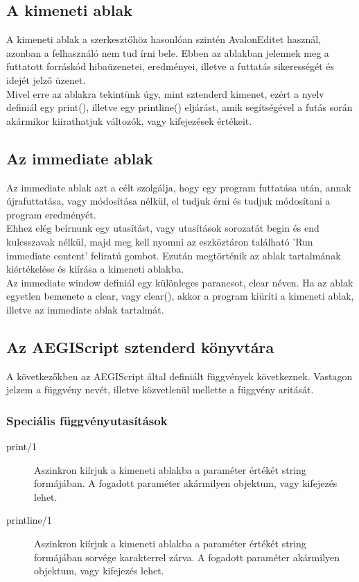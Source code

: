 \documentclass[a4paper,12pt]{report}
\begin{document}
\subsection{A kimeneti ablak}
A kimeneti ablak a szerkesztőhöz hasonlóan szintén AvalonEditet\cite{avalon} használ, azonban a felhasználó nem tud írni bele. Ebben az ablakban jelennek meg a futtatott forráskód hibaüzenetei, eredményei, illetve a futtatás sikerességét és idejét jelző üzenet. \\
Mivel erre az ablakra tekintünk úgy, mint sztenderd kimenet, ezért a nyelv definiál egy print(), illetve egy printline() eljárást, amik segítségével a futás során akármikor kiirathatjuk változók, vagy kifejezések értékeit.

\subsection{Az immediate ablak}
Az immediate ablak azt a célt szolgálja, hogy egy program futtatása után, annak újrafuttatása, vagy módosítása nélkül, el tudjuk érni és tudjuk módosítani a program eredményét. \\
Ehhez elég beírnunk egy utasítást, vagy utasítások sorozatát begin és end kulcsszavak nélkül, majd meg kell nyomni az eszköztáron található 'Run immediate content' feliratú gombot. Ezután megtörténik az ablak tartalmának kiértékelése és kiírása a kimeneti ablakba. \\
Az immediate window definiál egy különleges parancsot, clear néven. Ha az ablak egyetlen bemenete a clear, vagy clear(), akkor a program kiüríti a kimeneti ablak, illetve az immediate ablak tartalmát.

\subsection{Az AEGIScript sztenderd könyvtára}
A következőkben az AEGIScript által definiált függvények következnek. Vastagon jelzem a függvény nevét, illetve közvetlenül mellette a függvény aritását.

\subsubsection{Speciális függvényutasítások}
\begin{description}
\item[print/1] Aszinkron kiírjuk a kimeneti ablakba a paraméter értékét string formájában. A fogadott paraméter akármilyen objektum, vagy kifejezés lehet.
\item[printline/1] Aszinkron kiírjuk a kimeneti ablakba a paraméter értékét string formájában sorvége karakterrel zárva. A fogadott paraméter akármilyen objektum, vagy kifejezés lehet.
\end{description}
\end{document}
